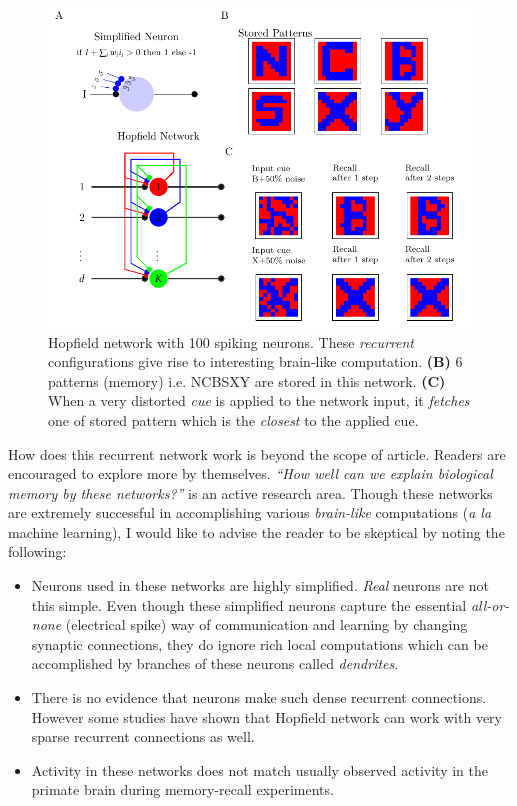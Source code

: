 \documentclass[]{resonance}
\begin{document}
\begin{figure}[!hb]
    \centering
    \caption{Hopfield network with 100 spiking neurons. These \emph{recurrent} 
        configurations give rise to interesting brain-like
        computation. \textbf{(B)} 6 patterns (memory) i.e. NCBSXY are stored in this
        network. \textbf{(C)} When a very distorted \textit{cue} is applied to
        the network input, it \textit{fetches} one of stored pattern which is
        the \emph{closest} to the applied cue.
    }\label{fig:hopfield}
    \includegraphics[width=\linewidth]{./hopfield.pdf}
\end{figure}

How does this recurrent network work is beyond the scope of article. Readers are
encouraged to explore more by themselves. \emph{``How well can we explain
biological memory by these networks?''} is an active research area.  Though
these networks are extremely successful in accomplishing various
\textit{brain-like} computations (\textit{a la} machine learning), I would like
to advise the reader to be skeptical by noting the following:

\begin{itemize}
    \item  Neurons used in these networks are highly simplified. \textit{Real}
        neurons are not this simple. Even though these simplified neurons
        capture the essential \textit{all-or-none} (electrical spike) way of
        communication and learning by changing synaptic connections, they do
        ignore rich local computations which can be accomplished by branches of
        these neurons called \textit{dendrites}.
    \item  There is no evidence that neurons make such dense recurrent
        connections. However some studies have shown that Hopfield network can
        work with very sparse recurrent connections as well.
    \item Activity in these networks does not match usually observed activity 
        in the primate brain during memory-recall experiments.
\end{itemize}
\end{document}
